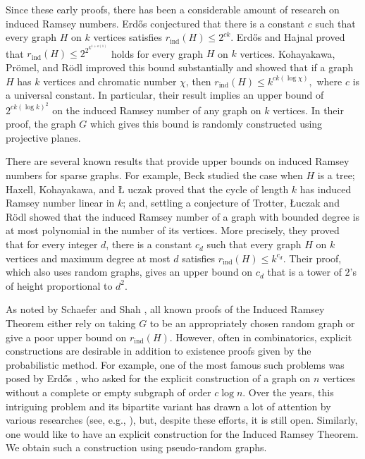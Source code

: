 \documentclass[11pt]{article}
\begin{document}
Since these early proofs, there has been a considerable amount of
research on induced Ramsey numbers. Erd\H{o}s \cite{Er2} conjectured
that there is a constant $c$ such that every graph $H$ on $k$
vertices satisfies $r_{\textrm{ind}}(H) \leq 2^{ck}$. Erd\H{o}s and
Hajnal \cite{Er1} proved that $r_{\textrm{ind}}(H) \leq
2^{2^{k^{1+o(1)}}}$ holds for every graph $H$ on $k$ vertices.
Kohayakawa, Pr\"omel, and R\"odl \cite{KoPrRo} improved this bound
substantially and showed that if a graph $H$ has $k$ vertices and
chromatic number $\chi$, then $r_{\textrm{ind}}(H) \leq k^{ck(\log
\chi)},$ where $c$ is a universal constant. In particular, their result
implies an upper bound of $2^{ck (\log k)^2}$ on the induced Ramsey
number of any graph on $k$ vertices. In their proof, the graph $G$
which gives this bound is randomly constructed using projective
planes.

There are several known results that provide upper bounds on induced
Ramsey numbers for sparse graphs. For example, Beck \cite{Be}
studied the case when $H$ is a tree; Haxell, Kohayakawa, and \L
uczak \cite{HaKoLu} proved that the cycle of length $k$ has induced
Ramsey number linear in $k$; and, settling a conjecture of Trotter,
\L uczak and R\"odl \cite{LuRo} showed that the induced Ramsey
number of a graph with bounded degree is at most polynomial in the
number of its vertices. More precisely, they proved  that for every
integer $d$, there is a constant $c_d$ such that every graph $H$ on
$k$ vertices and maximum degree at most $d$ satisfies
$r_{\textrm{ind}}(H) \leq k^{c_d}$. Their proof, which also uses
random graphs, gives an upper bound on $c_d$ that is a tower of
$2$'s of height proportional to $d^2$.

As noted by Schaefer and Shah \cite{SchSh}, all known proofs of the
Induced Ramsey Theorem either rely on taking $G$ to be an
appropriately chosen random graph or give a poor upper bound on
$r_{\textrm{ind}}(H)$. However, often in combinatorics, explicit
constructions are desirable in addition to existence proofs given by
the probabilistic method. For example, one of the most famous such
problems was posed by Erd\H{o}s \cite{AlSp}, who asked for the
explicit construction of a graph on $n$ vertices without a complete
or empty subgraph of order $ c\log n$. Over the years, this
intriguing problem and its bipartite variant has drawn a lot of attention
by various researches (see, e.g.,
\cite{FrWi,Al2,BaKiShSuWi,Bo,BaRaShWi}), but, despite these efforts,
it is still open. Similarly, one would like to have an explicit
construction for the Induced Ramsey Theorem. We obtain such a
construction using pseudo-random graphs.
\end{document}
